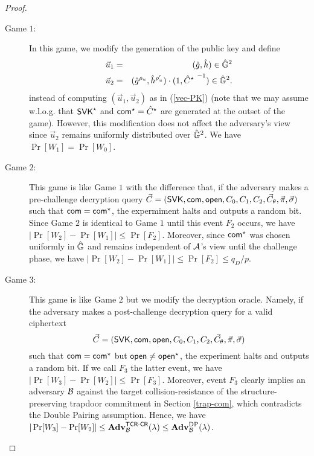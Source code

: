 \begin{proof}
\begin{description}
\item[\textsf{Game} $1$:] In this game, we modify the generation of the public key and define
\begin{eqnarray} \label{vec-PK-sim} 
 \vec{u}_1 &=& (\hat{g}, \hat{h}) \in \hat{\mathbb{G}}^2  \\ \nonumber 
 \vec{u}_2 &=&  (\hat{g}^{\rho_u}, \hat{h}^{\rho_u'}) \cdot (1,{\hat{C}^\star ~}^{-1})  \in \hat{\mathbb{G}}^2.
\end{eqnarray}
instead of computing $(\vec{u}_1,\vec{u}_2)$ as in (\ref{vec-PK}) (note that we may assume w.l.o.g. that $\mathsf{SVK}^\star$ and $\mathsf{com}^\star=\hat{C}^\star$ are 
 generated 
at the outset of the game).  However, this modification does not affect the adversary's view since $\vec{u}_2$ remains uniformly distributed 
over $\hat{\mathbb{G}}^2$. We have $\Pr[W_1]=\Pr[W_0]$.   \smallskip \smallskip 

\item[\textsf{Game} $2$:] This game is like Game $1$ with the difference that, if the adversary makes a pre-challenge decryption query 
 $ \vec{C} = (\mathsf{SVK}, \mathsf{com}, \mathsf{open}, C_0, C_1, C_2, \vec{C}_{\theta}, \vec{\pi}, \vec{\sigma})  $ such that $\mathsf{com}=\mathsf{com}^\star$, the expermiment halts and 
outputs a random bit. Since Game $2$ is identical to Game $1$ until this event $F_2$ occurs, we have 
$|\Pr[W_2]-\Pr[W_1]| \leq \Pr[F_2]$. Moreover, since $\mathsf{com}^\star$ was chosen uniformly in $\hat{\mathbb{G}}$ and remains independent of $\mathcal{A}$'s view until 
the challenge phase, we have $ |\Pr[W_2]-\Pr[W_1]| \leq \Pr[F_2] \leq q_D/p$. \smallskip \smallskip 


\item[\textsf{Game} $3$:] This game is like Game $2$ but we modify the decryption oracle. Namely, if the adversary makes a post-challenge decryption query 
for a valid ciphertext
$$ \vec{C} = (\mathsf{SVK}, \mathsf{com}, \mathsf{open}, C_0, C_1, C_2, \vec{C}_{\theta}, \vec{\pi}, \vec{\sigma})  $$
such that $\mathsf{com}=\mathsf{com}^\star$ but $\mathsf{open} \neq \mathsf{open}^\star$, the experiment halts and outputs a random bit. If we call $F_3$ the latter event, 
we have $|\Pr[W_3]-\Pr[W_2]| \leq \Pr[F_3]$. Moreover, event $F_3$ clearly implies an adversary $\mathcal{B}$ against the target collision-resistance of the 
structure-preserving trapdoor commitment in Section \ref{trap-com}, which contradicts the Double Pairing assumption. Hence, we have  
$|\Pr[W_3]-\Pr[W_2]| \leq \mathbf{Adv}_{\mathcal{B}}^{\mathsf{TCR}\textsf{-}\mathsf{CR}}(\lambda) \leq   \mathbf{Adv}_{\mathcal{B}}^{\mathrm{DP}}(\lambda)$.   \smallskip \smallskip 



\end{description}
\end{proof}
